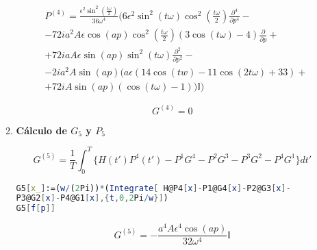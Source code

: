 \begin{itemize}
\begin{enumerate}
\begin{equation}
\begin{aligned}
        &P^{(4)}=\frac{\epsilon^2 \sin ^2\left(\frac{t \omega}{2}\right)}{36 \omega^4} (6 \epsilon^2  \sin ^2(t\omega) \cos^2 \left(\frac{t \omega}{2}\right)\frac{\partial^4}{\partial p^4}-\\&-72 i a^2 A \epsilon  \cos (a p) \cos
   ^2\left(\frac{t \omega}{2}\right) (3 \cos (t \omega)-4)\frac{\partial}{\partial p}+\\&+72 i a A \epsilon \sin (a p) \sin ^2(t \omega)\frac{\partial^2}{\partial p^2}-\\&-2 i a^2 A \sin (a p) (a \epsilon (14 \cos (t w)-11 \cos (2 t \omega)+33)+\\&+72 i A \sin (a p) (\cos
   (t \omega)-1))\mathbb{I})
    \end{aligned}
\end{equation}

\begin{equation}
    G^{(4)}=0
\end{equation}

\item \textbf{Cálculo de $G_5$ y $P_5$}

\begin{equation}
    G^{(5)}=\frac{1}{T}\int^{T}_{0}\{ H(t')P^{4}(t')- P^{1}G^{4}- P^{2}G^{3}- P^{3}G^{2}-P^{4}G^{1}\}dt'
\end{equation}

\begin{lstlisting}[language=Mathematica]
G5[x_]:=(w/(2Pi))*(Integrate[ H@P4[x]-P1@G4[x]-P2@G3[x]-
P3@G2[x]-P4@G1[x],{t,0,2Pi/w}])
G5[f[p]]
\end{lstlisting}


\begin{equation}
    G^{(5)}=-\frac{a^4 A \epsilon^4\cos(a p)}{32 \omega^4}\mathbb{I}
\end{equation}

\end{enumerate}

\end{itemize}


